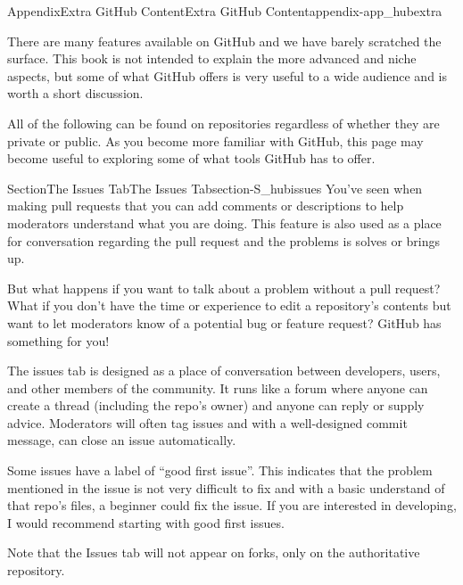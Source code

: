 \documentclass[oneside,10pt,]{book}
\begin{document}
%
\begin{appendixptx}{Appendix}{Extra GitHub Content}{}{Extra GitHub Content}{}{}{appendix-app_hubextra}
\renewcommand*{\appendixname}{Appendix}
%
\begin{introduction}{}%
There are many features available on GitHub and we have barely scratched the surface. This book is not intended to explain the more advanced and niche aspects, but some of what GitHub offers is very useful to a wide audience and is worth a short discussion.%
\par
All of the following can be found on repositories regardless of whether they are private or public. As you become more familiar with GitHub, this page may become useful to exploring some of what tools GitHub has to offer.%
\end{introduction}%
%
%
\typeout{************************************************}
\typeout{************************************************}
%
\begin{sectionptx}{Section}{The Issues Tab}{}{The Issues Tab}{}{}{section-S_hubissues}
%
%
You've seen when making pull requests that you can add comments or descriptions to help moderators understand what you are doing. This feature is also used as a place for conversation regarding the pull request and the problems is solves or brings up.%
\par
But what happens if you want to talk about a problem without a pull request? What if you don't have the time or experience to edit a repository's contents but want to let moderators know of a potential bug or feature request? GitHub has something for you!%
\par
The issues tab is designed as a place of conversation between developers, users, and other members of the community. It runs like a forum where anyone can create a thread (including the repo's owner) and anyone can reply or supply advice. Moderators will often tag issues and with a well-designed commit message, can close an issue automatically.%
\par
Some issues have a label of ``good first issue''. This indicates that the problem mentioned in the issue is not very difficult to fix and with a basic understand of that repo's files, a beginner could fix the issue. If you are interested in developing, I would recommend starting with good first issues.%
\par
Note that the Issues tab will not appear on forks, only on the authoritative repository.%

\end{sectionptx}
\end{appendixptx}
\end{document}
